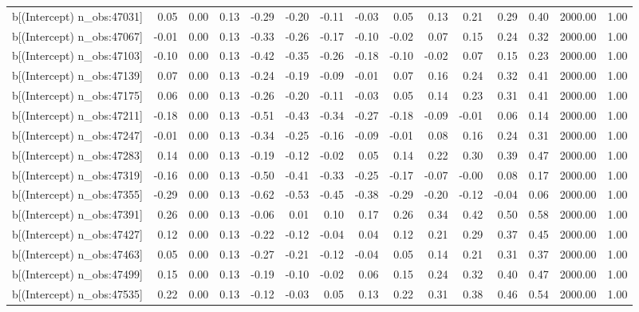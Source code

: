 \begin{table}[ht]
\begin{tabular}{rrrrrrrrrrrrrrr}
  b[(Intercept) n\_obs:47031] & 0.05 & 0.00 & 0.13 & -0.29 & -0.20 & -0.11 & -0.03 & 0.05 & 0.13 & 0.21 & 0.29 & 0.40 & 2000.00 & 1.00 \\ 
  b[(Intercept) n\_obs:47067] & -0.01 & 0.00 & 0.13 & -0.33 & -0.26 & -0.17 & -0.10 & -0.02 & 0.07 & 0.15 & 0.24 & 0.32 & 2000.00 & 1.00 \\ 
  b[(Intercept) n\_obs:47103] & -0.10 & 0.00 & 0.13 & -0.42 & -0.35 & -0.26 & -0.18 & -0.10 & -0.02 & 0.07 & 0.15 & 0.23 & 2000.00 & 1.00 \\ 
  b[(Intercept) n\_obs:47139] & 0.07 & 0.00 & 0.13 & -0.24 & -0.19 & -0.09 & -0.01 & 0.07 & 0.16 & 0.24 & 0.32 & 0.41 & 2000.00 & 1.00 \\ 
  b[(Intercept) n\_obs:47175] & 0.06 & 0.00 & 0.13 & -0.26 & -0.20 & -0.11 & -0.03 & 0.05 & 0.14 & 0.23 & 0.31 & 0.41 & 2000.00 & 1.00 \\ 
  b[(Intercept) n\_obs:47211] & -0.18 & 0.00 & 0.13 & -0.51 & -0.43 & -0.34 & -0.27 & -0.18 & -0.09 & -0.01 & 0.06 & 0.14 & 2000.00 & 1.00 \\ 
  b[(Intercept) n\_obs:47247] & -0.01 & 0.00 & 0.13 & -0.34 & -0.25 & -0.16 & -0.09 & -0.01 & 0.08 & 0.16 & 0.24 & 0.31 & 2000.00 & 1.00 \\ 
  b[(Intercept) n\_obs:47283] & 0.14 & 0.00 & 0.13 & -0.19 & -0.12 & -0.02 & 0.05 & 0.14 & 0.22 & 0.30 & 0.39 & 0.47 & 2000.00 & 1.00 \\ 
  b[(Intercept) n\_obs:47319] & -0.16 & 0.00 & 0.13 & -0.50 & -0.41 & -0.33 & -0.25 & -0.17 & -0.07 & -0.00 & 0.08 & 0.17 & 2000.00 & 1.00 \\ 
  b[(Intercept) n\_obs:47355] & -0.29 & 0.00 & 0.13 & -0.62 & -0.53 & -0.45 & -0.38 & -0.29 & -0.20 & -0.12 & -0.04 & 0.06 & 2000.00 & 1.00 \\ 
  b[(Intercept) n\_obs:47391] & 0.26 & 0.00 & 0.13 & -0.06 & 0.01 & 0.10 & 0.17 & 0.26 & 0.34 & 0.42 & 0.50 & 0.58 & 2000.00 & 1.00 \\ 
  b[(Intercept) n\_obs:47427] & 0.12 & 0.00 & 0.13 & -0.22 & -0.12 & -0.04 & 0.04 & 0.12 & 0.21 & 0.29 & 0.37 & 0.45 & 2000.00 & 1.00 \\ 
  b[(Intercept) n\_obs:47463] & 0.05 & 0.00 & 0.13 & -0.27 & -0.21 & -0.12 & -0.04 & 0.05 & 0.14 & 0.21 & 0.31 & 0.37 & 2000.00 & 1.00 \\ 
  b[(Intercept) n\_obs:47499] & 0.15 & 0.00 & 0.13 & -0.19 & -0.10 & -0.02 & 0.06 & 0.15 & 0.24 & 0.32 & 0.40 & 0.47 & 2000.00 & 1.00 \\ 
  b[(Intercept) n\_obs:47535] & 0.22 & 0.00 & 0.13 & -0.12 & -0.03 & 0.05 & 0.13 & 0.22 & 0.31 & 0.38 & 0.46 & 0.54 & 2000.00 & 1.00 \\ 

\end{tabular}
\end{table}
